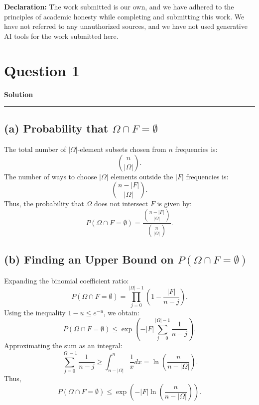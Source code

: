 \documentclass[a4paper,12pt]{article}
\title{\cooltitle{CS754 Assignment-1}}
\author{{\bf Saksham Rathi, Ekansh Ravi Shankar, Kshitij Vaidya}}
\date{}
\newenvironment{solution}[2][]{%
    \begin{mdframed}[linecolor=blue!70!black, linewidth=2pt, roundcorner=10pt, backgroundcolor=yellow!10!white, skipabove=12pt, skipbelow=12pt]%
        \textbf{\large #2}
        \par\noindent\rule{\textwidth}{0.4pt}
}{
    \end{mdframed}
}
\begin{document}
\maketitle
\textbf{Declaration:} The work submitted is our own, and
we have adhered to the principles of academic honesty while completing and submitting this work. We have not referred to any unauthorized sources, and we have not used generative AI tools for the work submitted here.

\section*{Question 1}

\begin{solution}{Solution}

  \subsection*{(a) Probability that $\Omega \cap F = \emptyset$}
 
  The total number of $|\Omega|$-element subsets chosen from $n$ frequencies is:
  \begin{equation}
  \binom{n}{|\Omega|}.
  \end{equation}
  The number of ways to choose $|\Omega|$ elements outside the $|F|$ frequencies is:
  \begin{equation}
  \binom{n - |F|}{|\Omega|}.
  \end{equation}
  Thus, the probability that $\Omega$ does not intersect $F$ is given by:
  \begin{equation}
  P(\Omega \cap F = \emptyset) = \frac{\binom{n - |F|}{|\Omega|}}{\binom{n}{|\Omega|}}.
  \end{equation}
   
  \subsection*{(b) Finding an Upper Bound on $P(\Omega \cap F = \emptyset)$}
  Expanding the binomial coefficient ratio:
  \begin{equation}
  P(\Omega \cap F = \emptyset) = \prod_{j=0}^{|\Omega|-1} \left(1 - \frac{|F|}{n - j}\right).
  \end{equation}
  Using the inequality $1 - u \leq e^{-u}$, we obtain:
  \begin{equation}
  P(\Omega \cap F = \emptyset) \leq \exp\left(-|F| \sum_{j=0}^{|\Omega|-1} \frac{1}{n - j}\right).
  \end{equation}
  Approximating the sum as an integral:
  \begin{equation}
  \sum_{j=0}^{|\Omega|-1} \frac{1}{n - j} \geq \int_{n - |\Omega|}^{n} \frac{1}{x}dx = \ln \left(\frac{n}{n - |\Omega|}\right).
  \end{equation}
  Thus,
  \begin{equation}
  P(\Omega \cap F = \emptyset) \leq \exp\left(-|F| \ln \left(\frac{n}{n - |\Omega|}\right)\right).
  \end{equation}


\end{solution}
\end{document}
